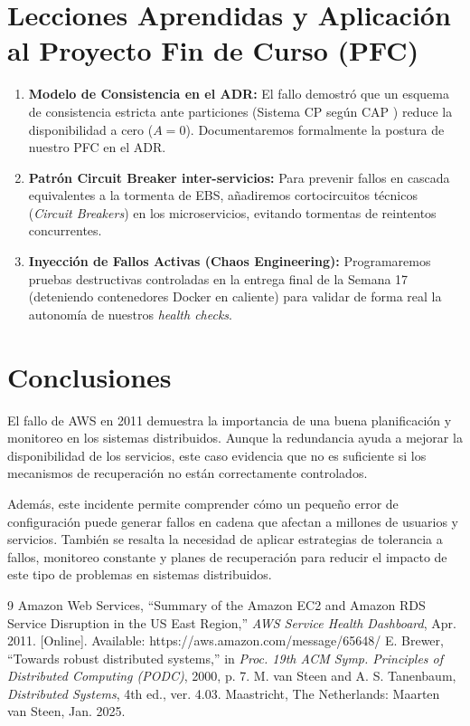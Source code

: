 \documentclass[10pt,a4paper]{article}
\begin{document}
\section{Lecciones Aprendidas y Aplicación al Proyecto Fin de Curso (PFC)}
\begin{enumerate}[leftmargin=*, noitemsep]
    \item \textbf{Modelo de Consistencia en el ADR:} El fallo demostró que un esquema de consistencia estricta ante particiones (Sistema CP según CAP \cite{brewer2000}) reduce la disponibilidad a cero ($A=0$). Documentaremos formalmente la postura de nuestro PFC en el ADR.
    \item \textbf{Patrón Circuit Breaker inter-servicios:} Para prevenir fallos en cascada equivalentes a la tormenta de EBS, añadiremos cortocircuitos técnicos (\textit{Circuit Breakers}) en los microservicios, evitando tormentas de reintentos concurrentes.
    \item \textbf{Inyección de Fallos Activas (Chaos Engineering):} Programaremos pruebas destructivas controladas en la entrega final de la Semana 17 (deteniendo contenedores Docker en caliente) para validar de forma real la autonomía de nuestros \textit{health checks}.
\end{enumerate}

\section{Conclusiones}

El fallo de AWS en 2011 demuestra la importancia de una buena planificación y monitoreo en los sistemas distribuidos. Aunque la redundancia ayuda a mejorar la disponibilidad de los servicios, este caso evidencia que no es suficiente si los mecanismos de recuperación no están correctamente controlados.

Además, este incidente permite comprender cómo un pequeño error de configuración puede generar fallos en cadena que afectan a millones de usuarios y servicios. También se resalta la necesidad de aplicar estrategias de tolerancia a fallos, monitoreo constante y planes de recuperación para reducir el impacto de este tipo de problemas en sistemas distribuidos\cite{tanenbaum2025}.

\begin{thebibliography}{9}
\small
{} Amazon Web Services, ``Summary of the Amazon EC2 and Amazon RDS Service Disruption in the US East Region,'' \textit{AWS Service Health Dashboard}, Apr. 2011. [Online]. Available: https://aws.amazon.com/message/65648/
 E. Brewer, ``Towards robust distributed systems,'' in \textit{Proc. 19th ACM Symp. Principles of Distributed Computing (PODC)}, 2000, p. 7.
 M. van Steen and A. S. Tanenbaum, \textit{Distributed Systems}, 4th ed., ver. 4.03. Maastricht, The Netherlands: Maarten van Steen, Jan. 2025.
\end{thebibliography}
\end{document}
